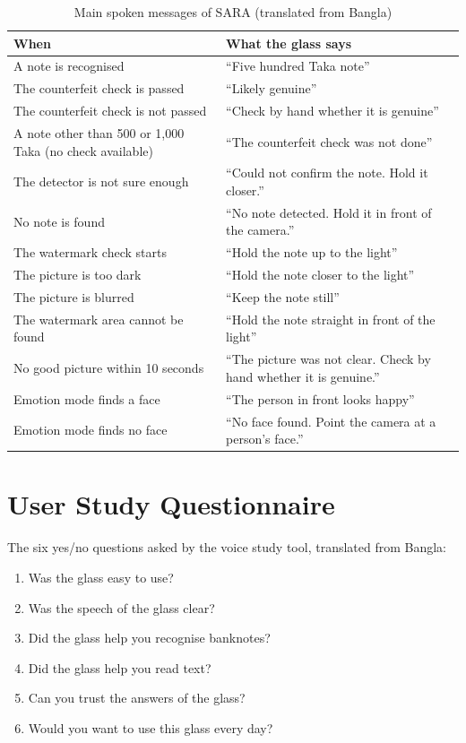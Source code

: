 \begin{table}[H]
\centering
\caption{Main spoken messages of SARA (translated from Bangla)}
\label{tab:app_messages}
\begin{tabular}{|L{5.0cm}|L{9.4cm}|}
\hline
\textbf{When} & \textbf{What the glass says} \\ \hline
A note is recognised & ``Five hundred Taka note'' \\ \hline
The counterfeit check is passed & ``Likely genuine'' \\ \hline
The counterfeit check is not passed & ``Check by hand whether it is genuine'' \\ \hline
A note other than 500 or 1,000 Taka (no check available) & ``The counterfeit check was not done'' \\ \hline
The detector is not sure enough & ``Could not confirm the note. Hold it closer.'' \\ \hline
No note is found & ``No note detected. Hold it in front of the camera.'' \\ \hline
The watermark check starts & ``Hold the note up to the light'' \\ \hline
The picture is too dark & ``Hold the note closer to the light'' \\ \hline
The picture is blurred & ``Keep the note still'' \\ \hline
The watermark area cannot be found & ``Hold the note straight in front of the light'' \\ \hline
No good picture within 10 seconds & ``The picture was not clear. Check by hand whether it is genuine.'' \\ \hline
Emotion mode finds a face & ``The person in front looks happy'' \\ \hline
Emotion mode finds no face & ``No face found. Point the camera at a person's face.'' \\ \hline
\end{tabular}
\end{table}

\section{User Study Questionnaire}
\label{app:questions}
The six yes/no questions asked by the voice study tool, translated from Bangla:
\begin{enumerate}[noitemsep]
    \item Was the glass easy to use?
    \item Was the speech of the glass clear?
    \item Did the glass help you recognise banknotes?
    \item Did the glass help you read text?
    \item Can you trust the answers of the glass?
    \item Would you want to use this glass every day?
\end{enumerate}

